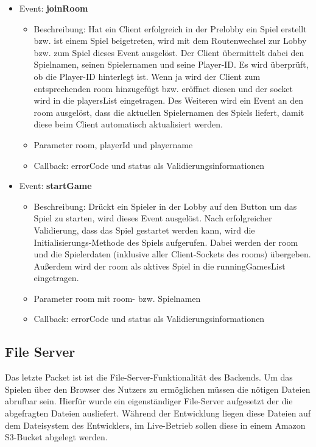 \documentclass[conference]{IEEEtran}
\begin{document}
\begin{itemize}
\item Event: \textbf{joinRoom}
\begin{itemize}
\item Beschreibung: Hat ein Client erfolgreich in der Prelobby ein Spiel erstellt bzw. ist einem Spiel beigetreten, wird mit dem Routenwechsel zur Lobby bzw. zum Spiel dieses Event ausgelöst.
Der Client übermittelt dabei den Spielnamen, seinen Spielernamen und seine Player-ID. Es wird überprüft, ob die Player-ID hinterlegt ist. Wenn ja wird der Client zum entsprechenden room hinzugefügt bzw. eröffnet diesen und der socket wird in die playersList eingetragen. Des Weiteren wird ein Event an den room ausgelöst, dass die aktuellen Spielernamen des Spiels liefert, damit diese beim Client automatisch aktualisiert werden.
\item Parameter \glqq room\grqq{}, \glqq playerId\grqq{} und \glqq playername\grqq{} 
\item Callback: \glqq errorCode\grqq{} und \glqq status\grqq{} als Validierungsinformationen
\end{itemize}

\item Event: \textbf{startGame}
\begin{itemize}
\item Beschreibung: Drückt ein Spieler in der Lobby auf den Button um das Spiel zu starten, wird dieses Event ausgelöst. Nach erfolgreicher Validierung, dass das Spiel gestartet werden kann, wird die Initialisierungs-Methode des Spiels aufgerufen. Dabei werden der room und die Spielerdaten (inklusive aller Client-Sockets des rooms) übergeben.
Außerdem wird der room als aktives Spiel in die runningGamesList eingetragen.
\item Parameter \glqq room\grqq{} mit room- bzw. Spielnamen 
\item Callback: \glqq errorCode\grqq{} und \glqq status\grqq{} als Validierungsinformationen
\end{itemize}

\end{itemize}


\subsection{File Server}
Das letzte Packet ist ist die File-Server-Funktionalität des Backends. Um das Spielen über den Browser des Nutzers zu ermöglichen müssen die nötigen Dateien abrufbar sein. Hierfür wurde ein eigenständiger File-Server aufgesetzt der die abgefragten Dateien ausliefert. Während der Entwicklung liegen diese Dateien auf dem Dateisystem des Entwicklers, im Live-Betrieb sollen diese in einem Amazon S3-Bucket abgelegt werden.
\end{document}
